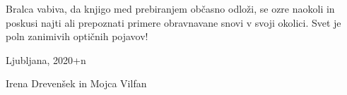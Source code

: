 \documentclass[11pt,fleqn]{book} %
\begin{document}
Bralca vabiva, da knjigo med prebiranjem občasno odloži, se ozre
naokoli in poskusi najti ali prepoznati primere obravnavane snovi
v svoji okolici. Svet je poln zanimivih optičnih pojavov!


\vspace{1em}

Ljubljana, 2020+n

\hfill Irena Drevenšek in Mojca Vilfan

\cleardoublepage
\thispagestyle{empty}
\mbox{}
\cleardoublepage














%
%
\printindex
\end{document}
